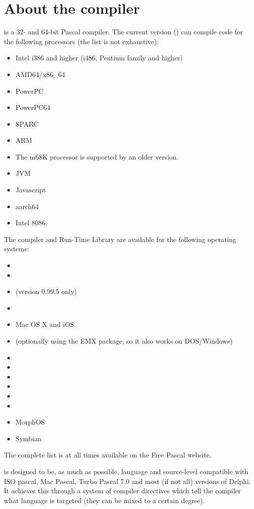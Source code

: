 \section{About the compiler}
\fpc is a 32- and 64-bit Pascal compiler. The current version (\fpcversion)
can compile code for the following processors (the list is not exhaustive):
\begin{itemize}
\item Intel i386 and higher (i486, Pentium family and higher)
\item AMD64/x86\_64
\item PowerPC
\item PowerPC64
\item SPARC
\item ARM
\item The m68K processor is supported by an older version.
\item JVM
\item Javascript
\item aarch64
\item Intel 8086.
\end{itemize}
The compiler and Run-Time Library are available for the following operating systems:
\begin{itemize}
\item \dos
\item \linux %
\item \amiga (version 0.99.5 only)
\item \windows
\item Mac OS X and iOS.
\item \ostwo (optionally using the EMX package, so it also works on DOS/Windows)
\item \freebsd
\item \beos
\item \solaris
\item \netbsd
\item \netware
\item \openbsd
\item MorphOS
\item Symbian
\end{itemize}
The complete list is at all times available on the Free Pascal website.

\fpc is designed to be, as much as possible, language and source-level compatible with
ISO pascal, Mac Pascal, Turbo Pascal 7.0 and most (if not all) versions of
Delphi. It achieves this through a system of compiler directives which tell
the compiler what language is targeted (they can be mixed to a certain
degree).

